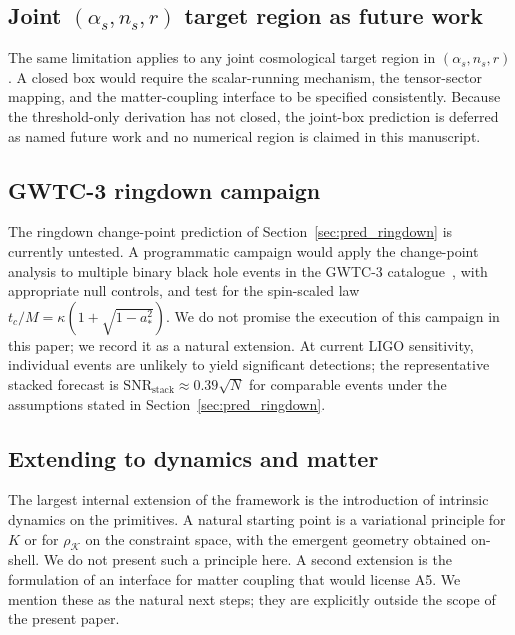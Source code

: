 ﻿\documentclass[12pt,a4paper]{article}
\theoremstyle{definition}
\begin{document}
\subsection[Joint scalar-tensor target region as future work]{Joint $(\alpha_s,n_s,r)$ target region as future work}
\label{sec:outlook_joint_box}

The same limitation applies to any joint cosmological target region in $(\alpha_s,n_s,r)$. A closed box would require the scalar-running mechanism, the tensor-sector mapping, and the matter-coupling interface to be specified consistently. Because the threshold-only derivation has not closed, the joint-box prediction is deferred as named future work and no numerical region is claimed in this manuscript.

\subsection{GWTC-3 ringdown campaign}
\label{sec:outlook_gwtc3}

The ringdown change-point prediction of Section~\ref{sec:pred_ringdown} is currently untested. A programmatic campaign would apply the change-point analysis to multiple binary black hole events in the GWTC-3 catalogue~\citep{lvc_tgr3}, with appropriate null controls, and test for the spin-scaled law $t_c/M=\kappa(1+\sqrt{1-a_\ast^2})$. We do not promise the execution of this campaign in this paper; we record it as a natural extension. At current LIGO sensitivity, individual events are unlikely to yield significant detections; the representative stacked forecast is $\mathrm{SNR}_{\mathrm{stack}}\approx0.39\sqrt{N}$ for comparable events under the assumptions stated in Section~\ref{sec:pred_ringdown}.

\subsection{Extending to dynamics and matter}
\label{sec:outlook_dynamics}

The largest internal extension of the framework is the introduction of intrinsic dynamics on the primitives. A natural starting point is a variational principle for $K$ or for $\rho_{\mathcal{K}}$ on the constraint space, with the emergent geometry obtained on-shell. We do not present such a principle here. A second extension is the formulation of an interface for matter coupling that would license A5. We mention these as the natural next steps; they are explicitly outside the scope of the present paper.
\end{document}
